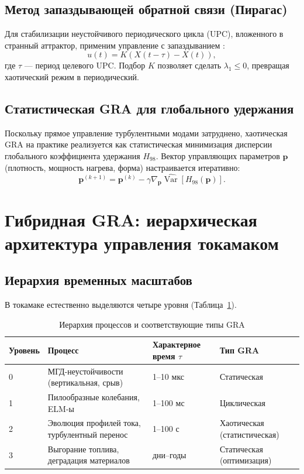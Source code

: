\documentclass[12pt,a4paper]{article}
\numberwithin{equation}{section}
\begin{document}
\subsection{Метод запаздывающей обратной связи (Пирагас)}
Для стабилизации неустойчивого периодического цикла (UPC), вложенного в странный аттрактор, применим управление с запаздыванием \cite{pyragas_1992}:
\begin{equation}
u(t) = K (X(t-\tau) - X(t)),
\label{eq:pyragas}
\end{equation}
где $\tau$ --- период целевого UPC. Подбор $K$ позволяет сделать $\lambda_1 \le 0$, превращая хаотический режим в периодический.

\subsection{Статистическая GRA для глобального удержания}
Поскольку прямое управление турбулентными модами затруднено, хаотическая GRA на практике реализуется как статистическая минимизация дисперсии глобального коэффициента удержания $H_{98}$. Вектор управляющих параметров $\mathbf{p}$ (плотность, мощность нагрева, форма) настраивается итеративно:
\begin{equation}
\mathbf{p}^{(k+1)} = \mathbf{p}^{(k)} - \gamma \nabla_{\mathbf{p}} \widehat{\operatorname{Var}}[H_{98}(\mathbf{p})].
\label{eq:stat_grad}
\end{equation}

\section{Гибридная GRA: иерархическая архитектура управления токамаком}
\label{sec:hybrid}

\subsection{Иерархия временных масштабов}
В токамаке естественно выделяются четыре уровня (Таблица~\ref{tab:hierarchy}).

\begin{table}[H]
\centering
\caption{Иерархия процессов и соответствующие типы GRA}
\label{tab:hierarchy}
\begin{tabular}{@{}llll@{}}
\toprule
Уровень & Процесс & Характерное время $\tau$ & Тип GRA \\
\midrule
0 & МГД-неустойчивости (вертикальная, срыв) & 1--10 мкс & Статическая \\
1 & Пилообразные колебания, ELM-ы & 1--100 мс & Циклическая \\
2 & Эволюция профилей тока, турбулентный перенос & 1--100 с & Хаотическая (статистическая) \\
3 & Выгорание топлива, деградация материалов & дни--годы & Статическая (оптимизация) \\
\bottomrule
\end{tabular}
\end{table}
\end{document}
